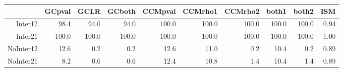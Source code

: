 \begin{table}[ht]
\centering
\begin{tabular}{rrrrrrrrrr}
  \hline
 & GCpval & GCLR & GCboth & CCMpval & CCMrho1 & CCMrho2 & both1 & both2 & ISM \\ 
  \hline
Inter12 & 98.4 & 94.0 & 94.0 & 100.0 & 100.0 & 100.0 & 100.0 & 100.0 & 0.94 \\ 
  Inter21 & 100.0 & 100.0 & 100.0 & 100.0 & 100.0 & 100.0 & 100.0 & 100.0 & 1.00 \\ 
  NoInter12 & 12.6 & 0.2 & 0.2 & 12.6 & 11.0 & 0.2 & 10.4 & 0.2 & 0.89 \\ 
  NoInter21 & 8.2 & 0.6 & 0.6 & 12.4 & 10.8 & 1.4 & 10.4 & 1.4 & 0.89 \\ 
   \hline
\end{tabular}
\end{table}

